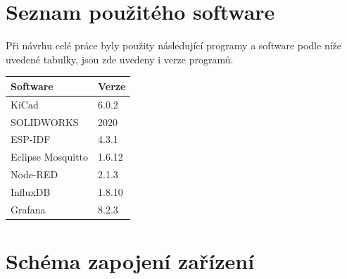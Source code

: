 \chapter{Seznam použitého software}

Při návrhu celé práce byly použity následující programy a software podle níže uvedené tabulky, jsou zde uvedeny i verze programů.

\bigskip
\begin{table}[!ht]
    \centering
    \begin{tabular}{|l|l|}
    \hline
        Software & Verze \\ \hline
        KiCad & 6.0.2 \\ \hline
        SOLIDWORKS & 2020 \\ \hline
        ESP-IDF & 4.3.1 \\ \hline
        Eclipse Mosquitto & 1.6.12 \\ \hline
        Node-RED & 2.1.3 \\ \hline
        InfluxDB & 1.8.10 \\ \hline
        Grafana & 8.2.3 \\ \hline
    \end{tabular}
\end{table}


\chapter{Schéma zapojení zařízení}




